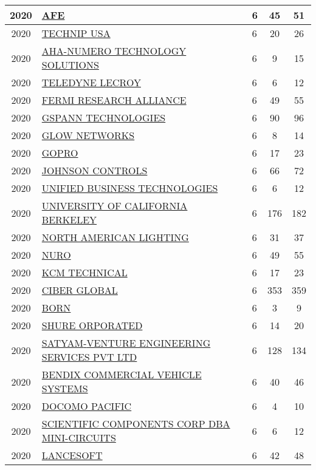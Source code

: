 \documentclass{article}%
\begin{document}
\begin{longtable}{c|p{20em}|p{5em}|c|c}
\hline%
2020&\hyperref[subsec:AFE]{AFE}&6&45&51\\%
\hline%
2020&\hyperref[subsec:TECHNIPUSA]{TECHNIP USA}&6&20&26\\%
\hline%
2020&\hyperref[subsec:AHA{-}NUMEROTECHNOLOGYSOLUTIONS]{AHA{-}NUMERO TECHNOLOGY SOLUTIONS}&6&9&15\\%
\hline%
2020&\hyperref[subsec:TELEDYNELECROY]{TELEDYNE LECROY}&6&6&12\\%
\hline%
2020&\hyperref[subsec:FERMIRESEARCHALLIANCE]{FERMI RESEARCH ALLIANCE}&6&49&55\\%
\hline%
2020&\hyperref[subsec:GSPANNTECHNOLOGIES]{GSPANN TECHNOLOGIES}&6&90&96\\%
\hline%
2020&\hyperref[subsec:GLOWNETWORKS]{GLOW NETWORKS}&6&8&14\\%
\hline%
2020&\hyperref[subsec:GOPRO]{GOPRO}&6&17&23\\%
\hline%
2020&\hyperref[subsec:JOHNSONCONTROLS]{JOHNSON CONTROLS}&6&66&72\\%
\hline%
2020&\hyperref[subsec:UNIFIEDBUSINESSTECHNOLOGIES]{UNIFIED BUSINESS TECHNOLOGIES}&6&6&12\\%
\hline%
2020&\hyperref[subsec:UNIVERSITYOFCALIFORNIABERKELEY]{UNIVERSITY OF CALIFORNIA BERKELEY}&6&176&182\\%
\hline%
2020&\hyperref[subsec:NORTHAMERICANLIGHTING]{NORTH AMERICAN LIGHTING}&6&31&37\\%
\hline%
2020&\hyperref[subsec:NURO]{NURO}&6&49&55\\%
\hline%
2020&\hyperref[subsec:KCMTECHNICAL]{KCM TECHNICAL}&6&17&23\\%
\hline%
2020&\hyperref[subsec:CIBERGLOBAL]{CIBER GLOBAL}&6&353&359\\%
\hline%
2020&\hyperref[subsec:BORN]{BORN}&6&3&9\\%
\hline%
2020&\hyperref[subsec:SHUREORPORATED]{SHURE ORPORATED}&6&14&20\\%
\hline%
2020&\hyperref[subsec:SATYAM{-}VENTUREENGINEERINGSERVICESPVTLTD]{SATYAM{-}VENTURE ENGINEERING SERVICES PVT LTD}&6&128&134\\%
\hline%
2020&\hyperref[subsec:BENDIXCOMMERCIALVEHICLESYSTEMS]{BENDIX COMMERCIAL VEHICLE SYSTEMS}&6&40&46\\%
\hline%
2020&\hyperref[subsec:DOCOMOPACIFIC]{DOCOMO PACIFIC}&6&4&10\\%
\hline%
2020&\hyperref[subsec:SCIENTIFICCOMPONENTSCORPDBAMINI{-}CIRCUITS]{SCIENTIFIC COMPONENTS CORP DBA MINI{-}CIRCUITS}&6&6&12\\%
\hline%
2020&\hyperref[subsec:LANCESOFT]{LANCESOFT}&6&42&48\\%

\end{longtable}
\end{document}
